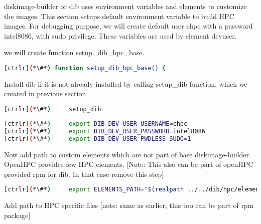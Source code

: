 
diskimage-builder or dib uses environment variables and elements to customize the images. This section setups default environment variable to build HPC images. For debugging purpose, we will create default user chpc with a password intel8086, with sudo privilege. These variables are used by element devuser. 

we will create function setup\_dib\_hpc\_base.

\begin{lstlisting}[language=bash,keywords={}]
[ctrlr](*\#*) function setup_dib_hpc_base() {
\end{lstlisting}

Install dib if it is not already installed by calling setup\_dib function, which we created in previous section

\begin{lstlisting}[language=bash,keywords={}]
[ctrlr](*\#*)     setup_dib
\end{lstlisting}

\begin{lstlisting}[language=bash,keywords={}]
[ctrlr](*\#*)     export DIB_DEV_USER_USERNAME=chpc
[ctrlr](*\#*)     export DIB_DEV_USER_PASSWORD=intel8086
[ctrlr](*\#*)     export DIB_DEV_USER_PWDLESS_SUDO=1
\end{lstlisting}

Now add path to custom elements which are not part of base diskimage-builder. OpenHPC provides few HPC elements. [Note: This also can be part of openHPC provided rpm for dib. In that case remove this step]

\begin{lstlisting}[language=bash,keywords={}]
[ctrlr](*\#*)     export ELEMENTS_PATH="$(realpath ../../dib/hpc/elements)"
\end{lstlisting}

Add path to HPC specific files [note: same as earlier, this too can be part of rpm package]

